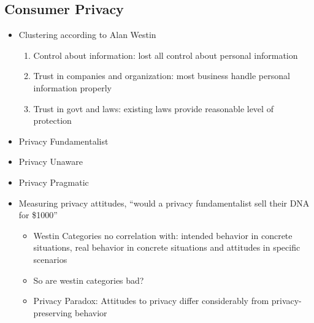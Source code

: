 \documentclass[a4paper,12pt]{scrartcl}
\begin{document}
\subsection{Consumer Privacy}
\begin{itemize}
	\item
		Clustering according to Alan Westin
		\begin{enumerate}
			\item
				Control about information: lost all control about personal information
			\item
				Trust in companies and organization: most business handle personal information properly
			\item
				Trust in govt and laws: existing laws provide reasonable level of protection
		\end{enumerate}
	\item
		Privacy Fundamentalist
	\item
		Privacy Unaware
	\item
		Privacy Pragmatic
	\item
		Measuring privacy attitudes, \enquote{would a privacy fundamentalist sell their DNA for \$1000}
		\begin{itemize}
			\item
				Westin Categories no correlation with: intended behavior in concrete situations, real behavior in concrete situations and attitudes in specific scenarios
			\item
				So are westin categories bad?
			\item
				Privacy Paradox: Attitudes to privacy differ considerably from privacy-preserving behavior


\end{itemize}
\end{itemize}
\end{document}
